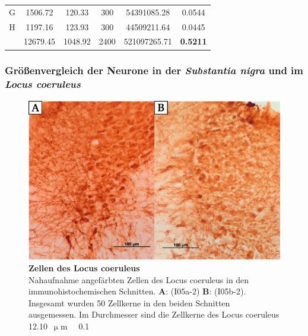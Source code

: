 \documentclass[12pt,a4paper,pdftex]{article}
\newcommand{\rpm}{\raisebox{.2ex}{$\scriptstyle\pm$} }
\begin{document}
\begin{table}[H]
{\begin{tabular}{cccccc}
G                                 & 1506.72                                 & 120.33                                   & 300                                    & 54391085.28                                & 0.0544                                     \\
H                                 & 1197.16                                 & 123.93                                   & 300                                    & 44509211.64                                & 0.0445                                     \\\hline
                                  & 12679.45                                & 1048.92                                  & 2400                                   & 521097265.71                               & \textbf{0.5211}                           
\end{tabular}%
}
\end{table}


\subsubsection{Größenvergleich der Neurone in der \textit{Substantia nigra} und im \textit{Locus coeruleus}}

\begin{figure}[H]
    \centering
    \includegraphics{pictures/immu/Zellen_LC.png}
    \caption[Zellen des Locus coeruleus]{\textbf{Zellen des Locus coeruleus}\\
    Nahaufnahme angefärbten Zellen des Locus coeruleus in den immunohistochemischen Schnitten. \textbf{A}: (I05a-2) \textbf{B}: (I05b-2). Insgesamt wurden 50 Zellkerne in den beiden Schnitten ausgemessen. Im Durchmesser sind die Zellkerne des Locus coeruleus 12.10~$\upmu$m~\rpm~0.1}
    \label{fig:Zellen_LC}
\end{figure}
\end{document}
